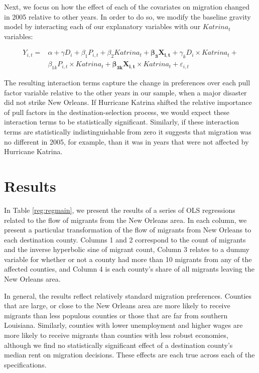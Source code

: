 \documentclass[]{article}
\begin{document}
Next, we focus on how the effect of each of the covariates on migration
changed in 2005 relative to other years. In order to do so, we modify
the baseline gravity model by interacting each of our explanatory
variables with our \({Katrina}_{t}\) variables:

\begin{equation} \label{eq:intreg}
\begin{split}
Y_{i,t} = &\alpha + \gamma {D}_{i} + \beta_1 {P}_{i,t} + \beta_2 {Katrina}_{t} + \mathbf{\beta_3} \mathbf{X_{i,t}} + \gamma_k {D}_{i} \times {Katrina}_{t} + \\
& \beta_{1k} {P}_{i,t} \times {Katrina}_{t} + \mathbf{\beta_{3k}} \mathbf{X_{i,t}} \times {Katrina}_{t} + \varepsilon_{i,t} 
\end{split}
\end{equation}

The resulting interaction terms capture the change in preferences over
each pull factor variable relative to the other years in our sample,
when a major disaster did not strike New Orleans. If Hurricane Katrina
shifted the relative importance of pull factors in the
destination-selection process, we would expect these interaction terms
to be statistically significant. Similarly, if these interaction terms
are statistically indistinguishable from zero it suggests that migration
was no different in 2005, for example, than it was in years that were
not affected by Hurricane Katrina.

\section{\texorpdfstring{Results
\label{sec:results}}{Results }}\label{results}

In Table \ref{reg:regmain}, we present the results of a series of OLS
regressions related to the flow of migrants from the New Orleans area.
In each column, we present a particular transformation of the flow of
migrants from New Orleans to each destination county. Columns 1 and 2
correspond to the count of migrants and the inverse hyperbolic sine of
migrant count, Column 3 relates to a dummy variable for whether or not a
county had more than 10 migrants from any of the affected counties, and
Column 4 is each county's share of all migrants leaving the New Orleans
area.

In general, the results reflect relatively standard migration
preferences. Counties that are large, or close to the New Orleans area
are more likely to receive migrants than less populous counties or those
that are far from southern Louisiana. Similarly, counties with lower
unemployment and higher wages are more likely to receive migrants than
counties with less robust economies, although we find no statistically
significant effect of a destination county's median rent on migration
decisions. These effects are each true across each of the
specifications.
\end{document}

